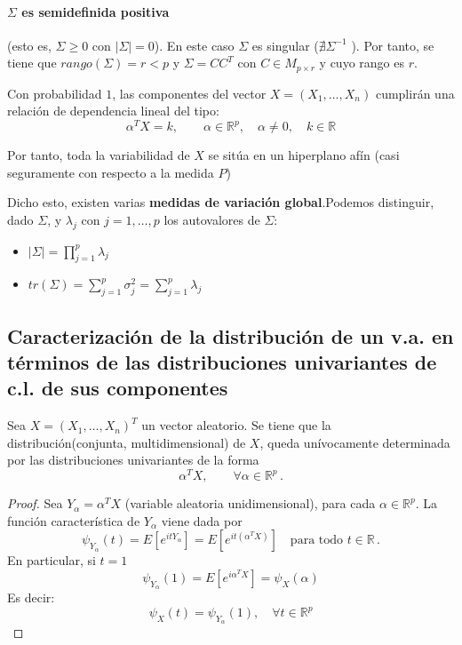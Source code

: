 \paragraph{$\Sigma$ es \textbf{semidefinida positiva}} (esto es, $\Sigma \geq 0$ con $|\Sigma| = 0$).  En este caso $\Sigma$ es singular ($\nexists \Sigma ^{-1} $ ). Por tanto, se tiene que $rango(\Sigma) = r < p$ y $\Sigma = C C^T$ con $C \in M_{p\times r}$ y cuyo rango es $r$.\\

  \begin{ncor}
    Con probabilidad $1$, las componentes del vector $X = (X_1, \dots, X_n)$ cumplirán una relación de dependencia lineal del tipo:
    \[
    \alpha^T X = k, \quad \quad \alpha \in \mathbb R^p, \quad \alpha \ne 0 , \quad k \in \mathbb R
    \]
    
  Por tanto, toda la variabilidad de $X$ se sitúa en un hiperplano afín (casi seguramente con respecto a la medida $P$)
  \end{ncor}

Dicho esto, existen varias \textbf{medidas de variación global}.Podemos distinguir, dado $\Sigma$, y $\lambda_j$ con $j = 1,\dots,p$ los autovalores de $\Sigma$:
\begin{itemize}
\item $|\Sigma| =  \prod_{j=1}^p \lambda_j$
  \item $tr(\Sigma) = \sum_{j = 1}^p \sigma_j^2 = \sum_{j=1}^p \lambda_j$
\end{itemize}


\subsection{Caracterización de la distribución de un v.a. en términos de las distribuciones univariantes de c.l. de sus componentes}

\begin{nth}
  Sea $X = (X_1,\dots, X_n)^T$ un vector aleatorio. Se tiene que la distribución(conjunta, multidimensional) de $X$, queda unívocamente determinada por las distribuciones univariantes de la forma
  \[
\alpha ^T X, \quad \quad \forall \alpha \in \mathbb R ^p\,.
  \]
\end{nth}
\begin{proof}
  Sea $Y_\alpha = \alpha^T X$ (variable aleatoria unidimensional), para cada $\alpha \in \mathbb R^p$. La función característica de $Y_\alpha$ viene dada por
  \[
  \psi_{Y_\alpha}(t) = E\left[e^{itY_\alpha}\right] = E \left[e^{it(\alpha^T X)}\right] \quad \text{para todo } t \in \mathbb R\,.
  \]
  En particular, si $t=1$
  \[
  \psi_{Y_\alpha}(1) = E\left[e^{i\alpha^T X}\right] = \psi_X (\alpha)
  \]
  Es decir:
  \[
  \psi_X(t) = \psi_{Y_\alpha}(1), \quad \forall t \in \mathbb R ^p
  \]
\end{proof}

